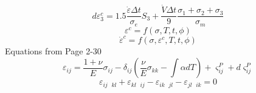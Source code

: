 \documentclass[12pt]{article}
\begin{document}
\begin{equation}
d\varepsilon_3^c=1.5 \frac{\dot{\varepsilon}\Delta t}{\sigma_e}S_3+\frac{\dot{V}\Delta t}{9} \frac{\sigma_1+\sigma_2+\sigma_3}{\sigma_m}
\end{equation}
\begin{equation}
\varepsilon^c=f(\sigma, T, t, \phi)
\end{equation}
\begin{equation}
\dot{\varepsilon}^c=f(\sigma, \varepsilon^c, T, t, \phi)
\end{equation}
Equations from Page 2-30
\begin{equation}
\varepsilon_{ij}=\frac{1+\nu}{E}\sigma_{ij}-\delta_{ij} \left( \frac{\nu}{E} \sigma_{kk}-\int \alpha dT \right) +\varsigma_{ij}^{P} +d\varsigma_{ij}^{P}
\end{equation}
\begin{equation}
\varepsilon_{ij\text{ }kl}+\varepsilon_{kl\text{ }ij}-\varepsilon_{ik\text{ }jl}-\varepsilon_{jl\text{ }ik}=0
\end{equation}
\end{document}
